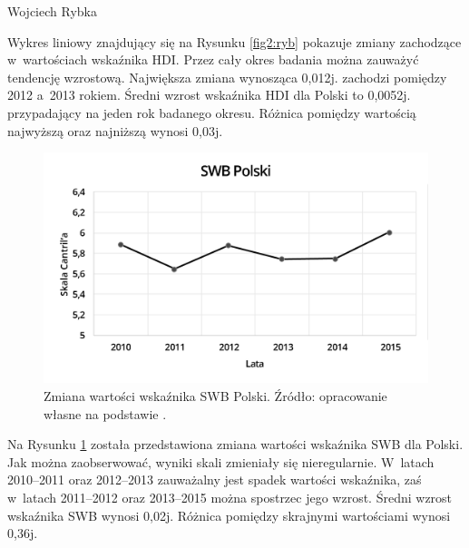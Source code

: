 \begin{artplenv}{Wojciech Rybka}
%
%

Wykres liniowy znajdujący się na Rysunku \ref{fig2:ryb} pokazuje zmiany zachodzące w~wartościach wskaźnika HDI. Przez cały okres
badania można zauważyć tendencję wzrostową. Największa zmiana wynosząca 0,012j. zachodzi pomiędzy 2012 a~2013 rokiem.
Średni wzrost wskaźnika HDI dla Polski to 0,0052j. przypadający na jeden rok badanego okresu. Różnica pomiędzy
wartością najwyższą oraz najniższą wynosi 0,03j.

\begin{figure}[H]
	\centering
	\includegraphics[width=1\textwidth]{ART_Rybka/swb_polski.png} 
	\caption{Zmiana wartości wskaźnika SWB Polski.
		Źródło: opracowanie własne na podstawie
		\parencite{noauthor_world_2018}.
	}
	\label{fig3:ryb}
\end{figure}


%
%

Na Rysunku \ref{fig3:ryb} została przedstawiona zmiana wartości wskaźnika SWB dla Polski. Jak można zaobserwować, wyniki skali
zmieniały się nieregularnie. W~latach 2010--2011 oraz 2012--2013 zauważalny jest spadek wartości wskaźnika, zaś w~latach
2011--2012 oraz 2013--2015 można spostrzec jego wzrost. Średni wzrost wskaźnika SWB wynosi 0,02j. Różnica pomiędzy
skrajnymi wartościami wynosi 0,36j.


\end{artplenv}
